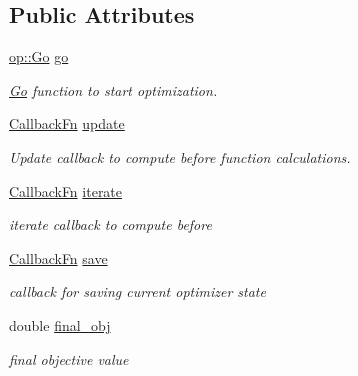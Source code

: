 \subsection*{Public Attributes}
\begin{DoxyCompactItemize}
\item 
\hypertarget{classop_1_1Optimizer_a2ce0f9e31b50befa3b747c45256a16e7}{\hyperlink{classop_1_1Go}{op\-::\-Go} \hyperlink{classop_1_1Optimizer_a2ce0f9e31b50befa3b747c45256a16e7}{go}}\label{classop_1_1Optimizer_a2ce0f9e31b50befa3b747c45256a16e7}

\begin{DoxyCompactList}\small\item\em \hyperlink{classop_1_1Go}{Go} function to start optimization. \end{DoxyCompactList}\item 
\hypertarget{classop_1_1Optimizer_a85c796202238fea34870e33f5c90ab1e}{\hyperlink{namespaceop_aa384cc9d57783c0a83be03e0fcbab4f4}{Callback\-Fn} \hyperlink{classop_1_1Optimizer_a85c796202238fea34870e33f5c90ab1e}{update}}\label{classop_1_1Optimizer_a85c796202238fea34870e33f5c90ab1e}

\begin{DoxyCompactList}\small\item\em Update callback to compute before function calculations. \end{DoxyCompactList}\item 
\hypertarget{classop_1_1Optimizer_a5dd4f175a15542dd57f442e093e30515}{\hyperlink{namespaceop_aa384cc9d57783c0a83be03e0fcbab4f4}{Callback\-Fn} \hyperlink{classop_1_1Optimizer_a5dd4f175a15542dd57f442e093e30515}{iterate}}\label{classop_1_1Optimizer_a5dd4f175a15542dd57f442e093e30515}

\begin{DoxyCompactList}\small\item\em iterate callback to compute before \end{DoxyCompactList}\item 
\hypertarget{classop_1_1Optimizer_a3f7887be306784dc329c24e43b14f252}{\hyperlink{namespaceop_aa384cc9d57783c0a83be03e0fcbab4f4}{Callback\-Fn} \hyperlink{classop_1_1Optimizer_a3f7887be306784dc329c24e43b14f252}{save}}\label{classop_1_1Optimizer_a3f7887be306784dc329c24e43b14f252}

\begin{DoxyCompactList}\small\item\em callback for saving current optimizer state \end{DoxyCompactList}\item 
\hypertarget{classop_1_1Optimizer_a74ab5895a6f2b74f155f19bd7a1e6f5a}{double \hyperlink{classop_1_1Optimizer_a74ab5895a6f2b74f155f19bd7a1e6f5a}{final\-\_\-obj}}\label{classop_1_1Optimizer_a74ab5895a6f2b74f155f19bd7a1e6f5a}

\begin{DoxyCompactList}\small\item\em final objective value \end{DoxyCompactList}\end{DoxyCompactItemize}



